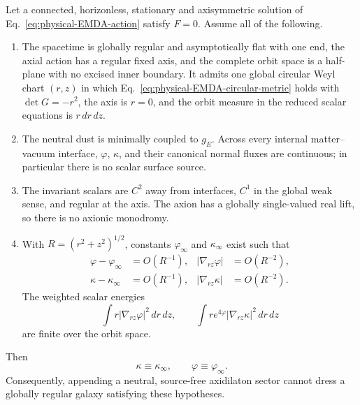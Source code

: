 \begin{theorem}
\label{thm:physical-neutral-axidilaton-rigidity}
Let a connected, horizonless, stationary and axisymmetric solution of
Eq.~\eqref{eq:physical-EMDA-action} satisfy $F=0$. Assume all of the
following.

\begin{enumerate}
\item The spacetime is globally regular and asymptotically flat with one
end, the axial action has a regular fixed axis, and the complete orbit
space is a half-plane with no excised inner boundary. It admits one global
circular Weyl chart $(r,z)$ in which
Eq.~\eqref{eq:physical-EMDA-circular-metric} holds with
$\det G=-r^2$, the axis is $r=0$, and the orbit measure in the reduced
scalar equations is $r\,dr\,dz$.

\item The neutral dust is minimally coupled to $g_E$. Across every internal
matter--vacuum interface, $\varphi$, $\kappa$, and their canonical normal
fluxes are continuous; in particular there is no scalar surface source.

\item The invariant scalars are $C^2$ away from interfaces, $C^1$ in the
global weak sense, and regular at the axis. The axion has a globally
single-valued real lift, so there is no axionic monodromy.

\item With $R=(r^2+z^2)^{1/2}$, constants $\varphi_\infty$ and
$\kappa_\infty$ exist such that
\begin{align}
 \varphi-\varphi_\infty&=O(R^{-1}),
 &
 |\nabla_{rz}\varphi|&=O(R^{-2}),
 \nonumber\\
 \kappa-\kappa_\infty&=O(R^{-1}),
 &
 |\nabla_{rz}\kappa|&=O(R^{-2}).
 \label{eq:physical-axidilaton-falloff}
\end{align}
The weighted scalar energies
\begin{equation}
 \int r|\nabla_{rz}\varphi|^2\,dr\,dz,
 \qquad
 \int re^{4\varphi}|\nabla_{rz}\kappa|^2\,dr\,dz
 \label{eq:physical-axidilaton-energies}
\end{equation}
are finite over the orbit space.
\end{enumerate}

Then
\begin{equation}
 \kappa\equiv\kappa_\infty,
 \qquad
 \varphi\equiv\varphi_\infty.
 \label{eq:physical-axidilaton-rigidity-conclusion}
\end{equation}
Consequently, appending a neutral, source-free axidilaton sector cannot
dress a globally regular galaxy satisfying these hypotheses.
\end{theorem}

